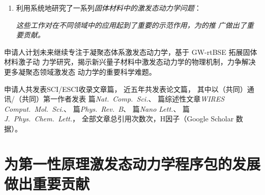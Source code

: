 \begin{enumerate}
\item 利用\hnamd{}系统地研究了一系列\emph{固体材料中的激发态动力学问题}：
  \emph{这些工作对\hnamd{}在不同领域中的应用起到了重要的示范作用，为\hnamd{}的推
    广做出了重要贡献。}
\end{enumerate}

申请人计划未来继续专注于凝聚态体系激发态动力学，基于 GW-rtBSE 拓展固体材料激子动
力学研究，揭示新兴量子材料中激发态动力学的物理机制，力争解决更多凝聚态领域激发态
动力学的重要科学难题。


申请人共发表SCI/ESCI收录文章篇，%
{
  近五年共发表论文篇，
  其中以（共同）通讯/（共同）第一作者发表
  篇{\itshape Nat.\ Comp.\ Sci.}、
  篇综述性文章{\itshape WIRES Comput.\ Mol.\ Sci.}、
  篇{\itshape Phys.\ Rev.\ B}、
  篇{\itshape Nano Lett.}、
  篇{\itshape J.\ Phys.\ Chem.\ Lett.}，
  全部文章总引用次数次，H因子（Google Scholar 数据）。
}

\section{为第一性原理激发态动力学程序包\hnamd{}的发展做出重要贡献}

